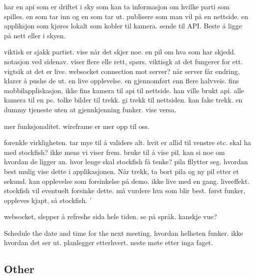 har en api som er driftet i sky som kan ta informasjon om hvilke parti som spilles. en som tar inn og en som tar ut. publisere som man vil på en nettside. en appliksjon som kjøres lokalt som kobler til kamera. sende til API. Beste å ligge på nett eller i skyen. 


viktisk er sjakk partiet. vise når det skjer noe. en pil om hva som har skjedd. notasjon ved sidenav. viser flere elle rett, spørs. viktisgk at det fungerer for ett. vigtsik at det er live. websocket connection mot server? når server får endring, klarer å pushe de ut. en live opplevelse. en gjennomført enn flere halvveis. fins mobbilappliskasjon, ikke fins kamera til api til nettside. han ville brukt api. alle kamera til en pc. tolke bilder til trekk. gi trekk til nettsiden. kan fake trekk. en dummy tjeneste uten at gjennkjenning funker. vise versa. 

mer funksjonalitet. wireframe er mer opp til oss. 

forenkle virkligheten. tar mye til å validere alt. hvit er allid til venstre etc. skal ha med stockfish? ikke mens vi viser frem. bruke til å vise pil. kan si noe om hvordan de ligger an. hvor lenge skal stockfish få tenke? pila fllytter seg. hvordan best mulig vise dette i applikasjonen. Når trekk, ta bort pila og ny pil etter et sekund. kan opplevelse som forsinkelse på demo. ikke live med en gang. liveeffekt. stockfish vil eventuelt forsinke dette. må vurdere hva som blir best. først funker, oppleves kjapt, så stockfish. '

websocket, slepper å refreshe sida hele tiden. se på språk. kanskje vue?


Schedule the date and time for the next meeting. hvordan helheten funker. ikke hvordan det ser ut. planlegger etterhvert. neste møte etter inga faget. 

\subsection{Other}